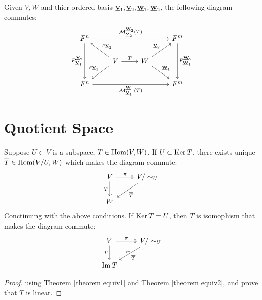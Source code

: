 \begin{theorem}
    Given $V, W$ and thier ordered basis $\bs{V}{1}, \bs{V}{2}, \bs{W}{1}, \bs{W}{2}$, the following diagram commutes:
    \[
        \begin{tikzcd}
            F^n \arrow[rrr, "\calM^{\bss{W}{2}}_{\bss{V}{2}}(T)"] \arrow[dd, "P^{\bss{V}{2}}_{\bss{V}{1}}"']
            &
            &
            & F^m \arrow[dd, "P^{\bss{W}{2}}_{\bss{W}{1}}"]
            \\
            & V \arrow[r, "T"] \arrow[lu, "\varphi_{\bss{V}{2}}"'] \arrow[ld, "\varphi_{\bss{V}{1}}"']
            & W \arrow[ru, "\bss{V}{2}"]  \arrow[rd, "\bss{W}{1}"]
            &
            \\
            F^n \arrow[rrr, "\calM^{\bss{W}{1}}_{\bss{V}{1}}(T)"']
            &
            &
            & F^m
        \end{tikzcd}
    \]
\end{theorem}









\section{Quotient Space}
\label{section 3.4}


\begin{theorem}
    \label{theorem 3.4.1}
    Suppose $U \subset V$ is a subspace, $T \in \operatorname{Hom}(V, W)$. If $U \subset \operatorname{Ker} T $, there exists unique $\overline{T} \in \operatorname{Hom}(V / U, W)$ which makes the diagram commute:
    \[
        \begin{tikzcd}
            V \arrow[two heads, r, "\pi"] \arrow[d, "T"']
            & V / \sim_U \arrow[ld, "\overline{T}"]
            \\
            W
        \end{tikzcd}
    \]
    Conctinuing with the above conditions. If $\operatorname{Ker} T = U$, then $\overline{T}$ is isomophism that makes the diagram commute:
    \[
        \begin{tikzcd}
            V \arrow[two heads, r, "\pi"] \arrow[d, "T"']
            & V / \sim_U \arrow[ld, "\overline{T}"] \arrow[ld, phantom, "\sim"', sloped, yshift=0.7ex]
            \\
            \Im T
        \end{tikzcd}
    \]
\end{theorem}


\begin{proof}
    using Theorem \ref{theorem equiv1} and Theorem \ref{theorem equiv2}, and prove that $\overline{T}$ is linear.
\end{proof}








